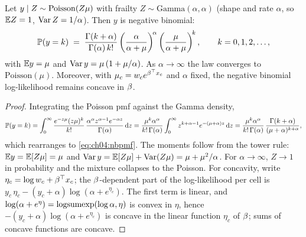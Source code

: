 \begin{proposition}\label{prop:ch04:negbin}
Let $y \mid Z \sim \mathrm{Poisson}(Z\mu)$ with frailty $Z \sim
\mathrm{Gamma}(\alpha, \alpha)$ (shape and rate $\alpha$, so $\mathbb{E} Z = 1$,
$\operatorname{Var} Z = 1/\alpha$). Then $y$ is negative binomial:
\begin{equation}\label{eq:ch04:nbpmf}
\mathbb{P}(y = k)
 \;=\;
 \frac{\Gamma(k + \alpha)}{\Gamma(\alpha)\, k!}
 \left(\frac{\alpha}{\alpha + \mu}\right)^{\!\alpha}
 \left(\frac{\mu}{\alpha + \mu}\right)^{\!k},
 \qquad k = 0, 1, 2, \ldots,
\end{equation}
with $\mathbb{E} y = \mu$ and $\operatorname{Var} y = \mu\,(1 + \mu/\alpha)$. As $\alpha \to
\infty$ the law converges to $\mathrm{Poisson}(\mu)$. Moreover, with
$\mu_c = w_c e^{\beta^{\top}x_c}$ and $\alpha$ fixed, the negative
binomial log-likelihood remains concave in $\beta$.
\end{proposition}

\begin{proof}
Integrating the Poisson pmf against the Gamma density,
\[
\mathbb{P}(y = k)
 = \int_0^\infty \frac{e^{-z\mu}(z\mu)^k}{k!}\,
 \frac{\alpha^\alpha z^{\alpha-1} e^{-\alpha z}}{\Gamma(\alpha)} \,\mathrm{d} z
 = \frac{\mu^k \alpha^\alpha}{k!\,\Gamma(\alpha)}
 \int_0^\infty z^{k+\alpha-1} e^{-(\mu+\alpha)z} \,\mathrm{d} z
 = \frac{\mu^k \alpha^\alpha}{k!\,\Gamma(\alpha)}\,
 \frac{\Gamma(k+\alpha)}{(\mu+\alpha)^{k+\alpha}},
\]
which rearranges to \cref{eq:ch04:nbpmf}. The moments follow from the
tower rule: $\mathbb{E} y = \mathbb{E}[Z\mu] = \mu$ and $\operatorname{Var} y = \mathbb{E}[Z\mu] +
\operatorname{Var}(Z\mu) = \mu + \mu^2/\alpha$. For $\alpha \to \infty$, $Z \to 1$ in
probability and the mixture collapses to the Poisson. For concavity,
write $\eta_c = \log w_c + \beta^{\top}x_c$; the $\beta$-dependent part
of the log-likelihood per cell is $y_c\,\eta_c - (y_c +
\alpha)\log(\alpha + e^{\eta_c})$. The first term is linear, and
$\log(\alpha + e^{\eta}) = \operatorname{logsumexp}(\log\alpha, \eta)$ is convex in
$\eta$, hence $-(y_c+\alpha)\log(\alpha + e^{\eta_c})$ is concave in the
linear function $\eta_c$ of $\beta$; sums of concave functions are
concave.
\end{proof}

